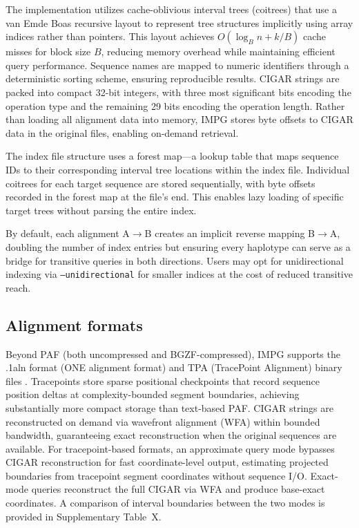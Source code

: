 The implementation utilizes cache-oblivious interval trees (coitrees) \cite{dcjones2020} that use a van Emde Boas recursive layout to represent tree structures implicitly using array indices rather than pointers. This layout achieves $O(\log_B n + k/B)$ cache misses for block size $B$, reducing memory overhead while maintaining efficient query performance. Sequence names are mapped to numeric identifiers through a deterministic sorting scheme, ensuring reproducible results. CIGAR strings are packed into compact 32-bit integers, with three most significant bits encoding the operation type and the remaining 29 bits encoding the operation length. Rather than loading all alignment data into memory, IMPG stores byte offsets to CIGAR data in the original files, enabling on-demand retrieval.

The index file structure uses a forest map---a lookup table that maps sequence IDs to their corresponding interval tree locations within the index file. Individual coitrees for each target sequence are stored sequentially, with byte offsets recorded in the forest map at the file's end. This enables lazy loading of specific target trees without parsing the entire index.

By default, each alignment A$\rightarrow$B creates an implicit reverse mapping B$\rightarrow$A, doubling the number of index entries but ensuring every haplotype can serve as a bridge for transitive queries in both directions. Users may opt for unidirectional indexing via \texttt{--unidirectional} for smaller indices at the cost of reduced transitive reach.

\subsection*{Alignment formats}

Beyond PAF (both uncompressed and BGZF-compressed), IMPG supports the .1aln format \cite{myers2025fastga} (ONE alignment format) and TPA (TracePoint Alignment) binary files \cite{tpa}. Tracepoints \cite{tpa} store sparse positional checkpoints that record sequence position deltas at complexity-bounded segment boundaries, achieving substantially more compact storage than text-based PAF. CIGAR strings are reconstructed on demand via wavefront alignment (WFA)  within bounded bandwidth, guaranteeing exact reconstruction when the original sequences are available. For tracepoint-based formats, an approximate query mode bypasses CIGAR reconstruction for fast coordinate-level output, estimating projected boundaries from tracepoint segment coordinates without sequence I/O. Exact-mode queries reconstruct the full CIGAR via WFA  and produce base-exact coordinates. A comparison of interval boundaries between the two modes is provided in Supplementary Table~X.

